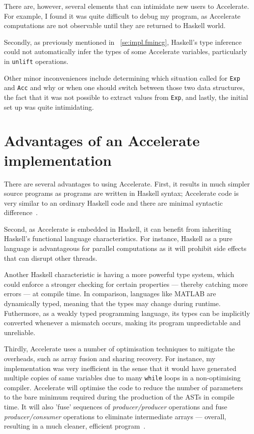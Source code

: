 There are, however, several elements that can intimidate new users to Accelerate. For example, I found it was quite difficult to debug my program, as Accelerate computations are not observable until they are returned to Haskell world. 

Secondly, as previously mentioned in ~\ref{se:impl.fmincg}, Haskell's type inference could not automatically infer the types of some Accelerate variables, particularly in \texttt{unlift} operations. 

Other minor inconveniences include determining which situation called for \texttt{Exp} and \texttt{Acc} and why or when one should switch between those two data structures, the fact that it was not possible to extract values from \texttt{Exp}, and lastly, the initial set up was quite intimidating.

\section{Advantages of an Accelerate implementation} \label{se:eval.advantages}

There are several advantages to using Accelerate. First, it results in much simpler source programs as programs are written in Haskell syntax; Accelerate code is very similar to an ordinary Haskell code and there are minimal syntactic difference~\cite{Mar13}.

Second, as Accelerate is embedded in Haskell, it can benefit from inheriting Haskell's functional language characteristics. For instance, Haskell as a pure language is advantageous for parallel computations as it will prohibit side effects that can disrupt other threads.

Another Haskell characteristic is having a more powerful type system, which could enforce a stronger checking for certain properties --- thereby catching more errors --- at compile time. In comparison, languages like MATLAB are dynamically typed, meaning that the types may change during runtime. Futhermore, as a weakly typed programming language, its types can be implicitly converted whenever a mismatch occurs, making its program unpredictable and unreliable.

Thirdly, Accelerate uses a number of optimisation techniques to mitigate the overheads, such as array fusion and sharing recovery\cite{ChaKelLee11}. For instance, my implementation was very inefficient in the sense that it would have generated multiple copies of same variables due to many \texttt{while} loops in a non-optimising compiler. Accelerate will optimise the code to reduce the number of parameters to the bare minimum required during the production of the ASTs in compile time. It will also 'fuse' sequences of \textit{producer/producer} operations and fuse \textit{producer/consumer} operations to eliminate intermediate arrays --- overall, resulting in a much cleaner, efficient program~\cite{McDChaGro}.

